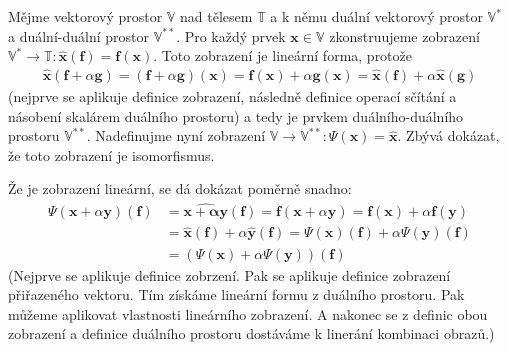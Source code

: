 \documentclass[a5paper,12pt]{amsbook}
\theoremstyle{definition}
\newcommand{\myvec}[1]{\mathbf{#1}}
\newcommand{\myspace}[1]{\mathbb{#1}}
\newcommand{\mydual}[1]{\myspace{#1^{*}}}
\newcommand{\mydouble}[1]{\myspace{#1^{**}}}
\newcommand{\mycocovec}[1]{\myvec{\widehat{#1}}}
\begin{document}
Mějme vektorový prostor $\myspace{V}$ nad tělesem $\myspace{T}$ a k němu duální vektorový prostor $\mydual{V}$
a duální-duální prostor $\mydouble{V}$. Pro každý prvek $\myvec{x}\in\myspace{V}$ zkonstruujeme zobrazení
$\mydual{V}\rightarrow\myspace{T}: \mycocovec{x}(\myvec{f}) = \myvec{f}(\myvec{x})$.
Toto zobrazení je lineární forma, protože
\begin{equation*}
\begin{split}
\mycocovec{x}(\myvec{f} + \alpha\myvec{g}) = (\myvec{f} + \alpha\myvec{g})(\myvec{x}) 
     = \myvec{f}(\myvec{x}) + \alpha\myvec{g}(\myvec{x})
     = \mycocovec{x}(\myvec{f}) + \alpha\mycocovec{x}(\myvec{g})
\end{split}
\end{equation*}
(nejprve se aplikuje definice zobrazení, následně definice operací sčítání a násobení skalárem duálního
prostoru) a tedy je prvkem duálního-duálního prostoru $\mydouble{V}$. Nadefinujme nyní zobrazení
$\myspace{V}\rightarrow\mydouble{V}: \Psi(\myvec{x}) = \mycocovec{x}$. Zbývá
dokázat, že toto zobrazení je isomorfismus.

\medskip\noindent
Že je zobrazení lineární, se dá dokázat poměrně snadno:
\begin{equation*}
\begin{split}
\Psi(\myvec{x} + \alpha\myvec{y})(\myvec{f}) &= \mycocovec{\myvec{x} + \alpha\myvec{y}}(\myvec{f})
     = \myvec{f}(\myvec{x} + \alpha\myvec{y}) = \myvec{f}(\myvec{x}) + \alpha\myvec{f}(\myvec{y}) \\
     &= \mycocovec{x}(\myvec{f}) + \alpha\mycocovec{y}(\myvec{f})
     = \Psi(\myvec{x})(\myvec{f}) + \alpha\Psi(\myvec{y})(\myvec{f}) \\
     &= (\Psi(\myvec{x}) + \alpha\Psi(\myvec{y}))(\myvec{f})
\end{split}
\end{equation*}
(Nejprve se aplikuje definice zobrzení. Pak se aplikuje definice zobrazení přiřazeného vektoru.
Tím získáme lineární formu z duálního prostoru. Pak můžeme aplikovat vlastnosti lineárního
zobrazení. A nakonec se z definic obou zobrazení a definice duálního prostoru dostáváme k linerání
kombinaci obrazů.)
\end{document}
